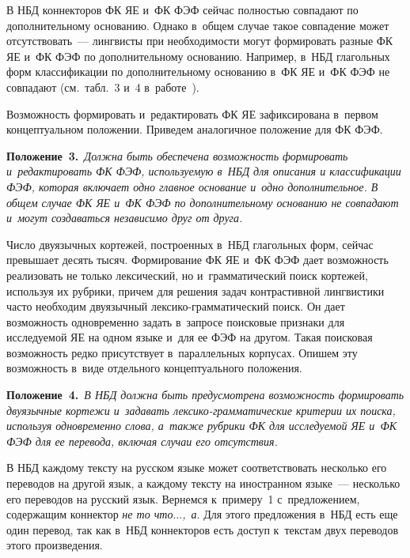 \begin{multicols}{2}
\addtocounter{table}{1}

\vspace*{6pt}

  
 
  В НБД коннекторов ФК ЯЕ и~ФК ФЭФ сейчас полностью совпадают по 
дополнительному основанию. Однако в~общем случае такое совпадение 
может отсутствовать~--- лингвисты при необходи\-мости могут формировать 
разные ФК ЯЕ и~ФК ФЭФ по дополнительному основанию. Например, в~НБД 
глагольных форм классификации по дополнительному основанию в~ФК ЯЕ 
и~ФК ФЭФ не совпадают (см.\ табл.~3 и~4 в~работе~\cite{3-zat}).
  
  Возможность формировать и~редактировать ФК ЯЕ зафиксирована 
в~первом концептуальном положении. Приведем аналогичное положение 
для ФК ФЭФ.
  
  \smallskip
  
  \noindent
  \textbf{Положение~3.}\ \textit{Должна быть обеспечена возможность 
формировать и~редактировать ФК ФЭФ, используемую в~НБД для описания 
и классификации ФЭФ, которая включает одно главное основание и~одно 
дополнительное. В общем случае ФК ЯЕ и~ФК ФЭФ по дополнительному 
основанию не совпадают и~могут создаваться независимо друг от друга.}
  
  \smallskip
  
  Число двуязычных кортежей, построенных в~НБД глагольных форм, 
сейчас превышает десять тысяч. Формирование ФК ЯЕ и~ФК ФЭФ дает 
возможность реализовать не только лексический, но и~грамматический поиск 
кортежей, используя их руб\-ри\-ки, причем для решения задач контрастивной 
лингвистики часто необходим двуязычный лек\-си\-ко-грам\-ма\-ти\-че\-ский 
поиск. Он дает возможность одновременно задать в~запросе поисковые 
признаки для исследуемой ЯЕ на одном языке и~для ее ФЭФ на другом. 
Такая поисковая возможность редко присутствует в~параллельных корпусах. 
Опишем эту возможность в~виде отдельного концептуального положения.
  
  \smallskip
  
  \noindent
  \textbf{Положение~4.}\ \textit{В НБД должна быть предусмотрена 
возможность формировать двуязычные кортежи и~задавать  
лек\-си\-ко-грам\-ма\-ти\-че\-ские критерии их поиска, используя 
одновременно слова, а~также рубрики ФК для исследуемой ЯЕ и~ФК ФЭФ 
для ее перевода, включая случаи его отсутствия.}
  
  \smallskip
  
  В НБД каждому тексту на русском языке может соответствовать несколько 
его переводов на другой язык, а каждому тексту на иностранном языке~--- 
несколько его переводов на русский язык. Вернемся к~примеру~1 
с~предложением, содержащим коннектор \textit{не то что$\ldots$,~а}. Для 
этого предложения в~НБД есть еще один перевод, так как в~НБД коннекторов 
есть доступ к~текстам двух переводов этого произведения.


\end{multicols}
